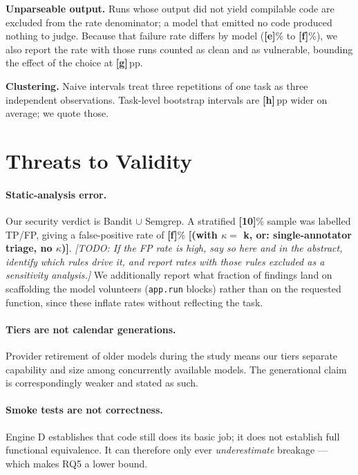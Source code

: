 \documentclass[10pt,conference]{article}
\newcommand{\PLACEHOLDER}[1]{{\color{placeholderred}\textbf{[#1]}}}
\newcommand{\TODO}[1]{{\color{placeholderred}\textit{[TODO: #1]}}}
\begin{document}
\textbf{Unparseable output.} Runs whose output did not yield compilable code are
excluded from the rate denominator; a model that emitted no code produced nothing
to judge. Because that failure rate differs by model (\PLACEHOLDER{e}\% to
\PLACEHOLDER{f}\%), we also report the rate with those runs counted as clean and
as vulnerable, bounding the effect of the choice at \PLACEHOLDER{g}\,pp.

\textbf{Clustering.} Naive intervals treat three repetitions of one task as three
independent observations. Task-level bootstrap intervals are
\PLACEHOLDER{h}\,pp wider on average; we quote those.

\section{Threats to Validity}

\paragraph{Static-analysis error.} Our security verdict is Bandit $\cup$ Semgrep.
A stratified \PLACEHOLDER{10}\% sample was labelled TP/FP, giving a
false-positive rate of \PLACEHOLDER{f}\% \PLACEHOLDER{(with $\kappa =$ k, or:
single-annotator triage, no $\kappa$)}. \TODO{If the FP rate is high, say so here
and in the abstract, identify which rules drive it, and report rates with those
rules excluded as a sensitivity analysis.} We additionally report what fraction
of findings land on scaffolding the model volunteers (\texttt{app.run} blocks)
rather than on the requested function, since these inflate rates without
reflecting the task.

\paragraph{Tiers are not calendar generations.} Provider retirement of older
models during the study means our tiers separate capability and size among
concurrently available models. The generational claim is correspondingly weaker
and stated as such.

\paragraph{Smoke tests are not correctness.} Engine D establishes that code still
does its basic job; it does not establish full functional equivalence. It can
therefore only ever \emph{underestimate} breakage --- which makes RQ5 a lower
bound.
\end{document}
